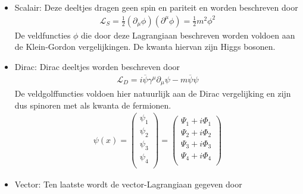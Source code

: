 \documentclass[../main.tex]{subfiles}
\begin{document}
\begin{itemize}
    \item Scalair: Deze deeltjes dragen geen spin en pariteit en worden beschreven door
        \begin{equation}
            \begin{aligned}
                \label{eq:lagr_scalair}
                \mathcal{L}_S = \frac{1}{2} (\partial_\mu \phi)(\partial^\mu \phi) = \frac{1}{2} m^2\phi^2
            \end{aligned}
        \end{equation}
        De veldfuncties $\phi$ die door deze Lagrangiaan beschreven worden voldoen aan de Klein-Gordon vergelijkingen. De kwanta hiervan zijn Higgs bosonen.
    \item Dirac: Dirac deeltjes worden beschreven door
        \begin{equation}
            \begin{aligned}
                \label{eq:lagr_dirac}
                \mathcal{L}_D = i\overline \psi \gamma^\mu \partial_\mu \psi - m \overline \psi\psi
            \end{aligned}
        \end{equation}
        De veldgolffuncties voldoen hier natuurlijk aan de Dirac vergelijking en zijn dus spinoren met als kwanta de fermionen.
        \begin{equation}
            \begin{aligned}
                \label{eq:veld_func_dirac}
                \psi(x) =
                \begin{pmatrix}
                    \psi_1\\
                    \psi_2\\
                    \psi_3\\
                    \psi_4\\
                \end{pmatrix}=
                \begin{pmatrix}
                    \Psi_1 + i\Phi_1\\
                    \Psi_2 + i\Phi_2\\
                    \Psi_3 + i\Phi_3\\
                    \Psi_4 + i\Phi_4\\
                \end{pmatrix}
            \end{aligned}
        \end{equation}
    \item Vector: Ten laatste wordt de vector-Lagrangiaan gegeven door

\end{itemize}
\end{document}
